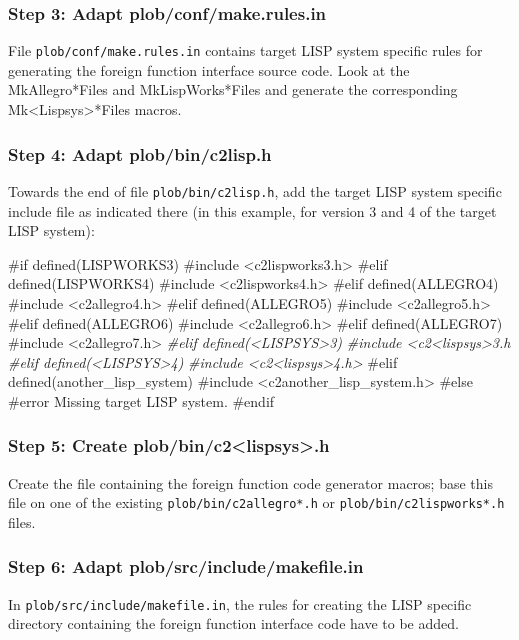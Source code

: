 \subsubsection{Step 3: Adapt plob/conf/make.rules.in}

File \texttt{plob/conf/make.rules.in} contains target LISP system
specific rules for generating the foreign function interface source
code.  Look at the MkAllegro*Files and MkLispWorks*Files and generate
the corresponding Mk<Lispsys>*Files macros.

\subsubsection{Step 4: Adapt plob/bin/c2lisp.h}

Towards the end of file \texttt{plob/bin/c2lisp.h}, add the target
LISP system specific include file as indicated there (in this example,
for version 3 and 4 of the target LISP system):
\begin{CompactCode}
#if defined(LISPWORKS3)
#include	<c2lispworks3.h>
#elif defined(LISPWORKS4)
#include	<c2lispworks4.h>
#elif defined(ALLEGRO4)
#include	<c2allegro4.h>
#elif defined(ALLEGRO5)
#include	<c2allegro5.h>
#elif defined(ALLEGRO6)
#include	<c2allegro6.h>
#elif defined(ALLEGRO7)
#include	<c2allegro7.h>
\emph{#elif defined(<LISPSYS>3)}
\emph{#include	<c2<lispsys>3.h}
\emph{#elif defined(<LISPSYS>4)}
\emph{#include	<c2<lispsys>4.h>}
#elif defined(another_lisp_system)
#include	<c2another_lisp_system.h>
#else
#error Missing target LISP system.
#endif
\end{CompactCode}

\subsubsection{Step 5: Create plob/bin/c2<lispsys>.h}

Create the file containing the foreign function code generator macros;
base this file on one of the existing \texttt{plob/bin/c2allegro*.h}
or \texttt{plob/bin/c2lispworks*.h} files.

\subsubsection{Step 6: Adapt plob/src/include/makefile.in}

In \texttt{plob/src/include/makefile.in}, the rules for creating the
LISP specific directory containing the foreign function interface code
have to be added.

